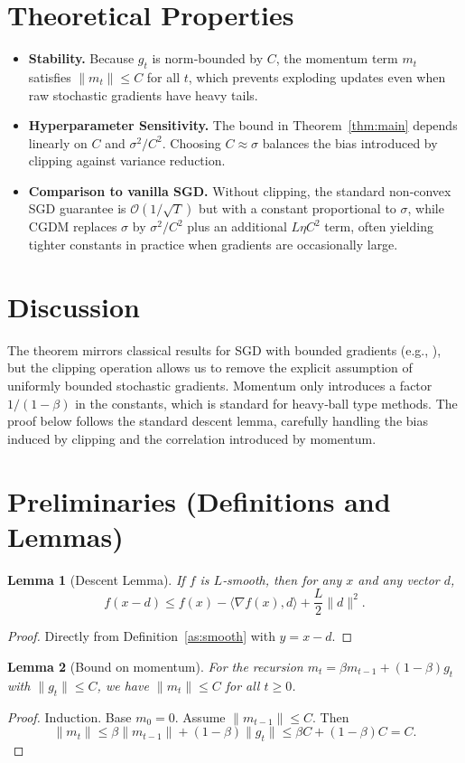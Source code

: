 \documentclass{article}
\newtheorem{lemma}{Lemma}
\begin{document}
\section*{Theoretical Properties}
\begin{itemize}[leftmargin=*,labelsep=5mm]
\item \textbf{Stability.} Because $g_t$ is norm‑bounded by $C$, the momentum term $m_t$ satisfies $\|m_t\|\le C$ for all $t$, which prevents exploding updates even when raw stochastic gradients have heavy tails.
\item \textbf{Hyperparameter Sensitivity.} The bound in Theorem~\ref{thm:main} depends linearly on $C$ and $\sigma^2/C^2$. Choosing $C\approx\sigma$ balances the bias introduced by clipping against variance reduction.
\item \textbf{Comparison to vanilla SGD.} Without clipping, the standard non‑convex SGD guarantee is $\mathcal O(1/\sqrt{T})$ but with a constant proportional to $\sigma$, while CGDM replaces $\sigma$ by $\sigma^2/C^2$ plus an additional $L\eta C^2$ term, often yielding tighter constants in practice when gradients are occasionally large.
\end{itemize}

\section*{Discussion}
The theorem mirrors classical results for SGD with bounded gradients (e.g., \cite{Ghadimi2013}), but the clipping operation allows us to remove the explicit assumption of uniformly bounded stochastic gradients. Momentum only introduces a factor $1/(1-\beta)$ in the constants, which is standard for heavy‑ball type methods. The proof below follows the standard descent lemma, carefully handling the bias induced by clipping and the correlation introduced by momentum.

\section*{Preliminaries (Definitions and Lemmas)}
\begin{lemma}[Descent Lemma]\label{lem:descent}
If $f$ is $L$‑smooth, then for any $x$ and any vector $d$,
\[
f(x-d)\le f(x)-\langle\nabla f(x),d\rangle+\frac{L}{2}\|d\|^2 .
\]
\end{lemma}
\begin{proof}
Directly from Definition~\ref{as:smooth} with $y=x-d$.
\end{proof}
\begin{lemma}[Bound on momentum]\label{lem:momentum}
For the recursion $m_t=\beta m_{t-1}+(1-\beta)g_t$ with $\|g_t\|\le C$, we have $\|m_t\|\le C$ for all $t\ge0$.
\end{lemma}
\begin{proof}
Induction. Base $m_0=0$. Assume $\|m_{t-1}\|\le C$. Then
\[
\|m_t\|\le \beta\|m_{t-1}\|+(1-\beta)\|g_t\|
\le \beta C+(1-\beta)C=C .
\]
\end{proof}
\end{document}
